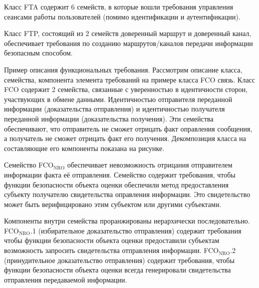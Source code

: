 \documentclass[12pt, russian, oneside, article]{ncc}
\begin{document}
Класс FTA содержит 6 семейств, в которые вошли требования управления сеансами работы пользователей (помимо идентификации и аутентификации).

Класс FTP, состоящий из 2 семейств доверенный маршрут и доверенный канал, обеспечивает требования по созданию маршрутов/каналов передачи информации безопасным способом.

Пример описания функциональных требования. Рассмотрим описание класса, семейства, компонента элемента требований на примере класса FCO связь. Класс FCO содержит 2 семейства, связанные с уверенностью в идентичности сторон, участвующих в обмене данными. Идентичностью отправителя переданной информации (доказательства отправления) и идентичностью получателя переданной информации (доказательства получения). Эти семейства обеспечивают, что отправитель не сможет отрицать факт оправления сообщения, а получатель не сможет отрицать факт его получения. Декомпозиция класса на составляющие его компоненты показана на рисунке.

Семейство FCO$_{\mathrm{NRO}}$ обеспечивает невозможность отрицания отправителем информации факта её отправления. Семейство содержит требования, чтобы функции безопасности объекта оценки обеспечили метод предоставления субъекту получателю свидетельства оправления информации. Это свидетельство может быть верифицировано этим субъектом или другими субъектами.

Компоненты внутри семейства проранжированы иерархически последовательно. FCO$_{\mathrm{NRO}}$.1 (избирательное доказательство отправления) содержит требования чтобы функции безопасности объекта оценки предоставили субъектам возможность запросить свидетельства отправления информации. FCO$_{\mathrm{NRO}}$.2 (принудительное доказательство отправления) содержит требования, чтобы функции безопасности объекта оценки всегда генерировали свидетельства отправления передаваемой информации.
\end{document}
